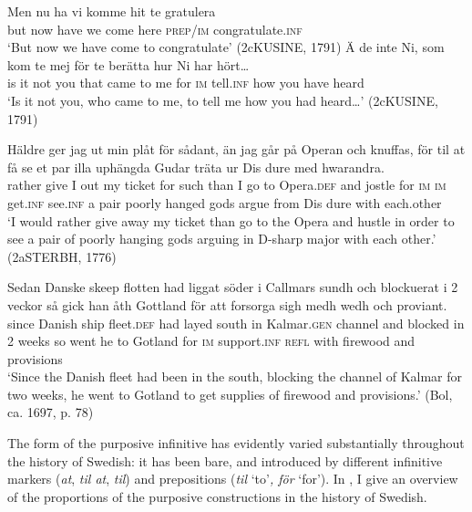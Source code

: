 \documentclass[output=paper]{langscibook}
\begin{document}
\ea
\label{ex:kalm:11}
\ea  \label{ex:kalm:11a}
\gll Men nu ha vi komme hit te gratulera\\
but now have we come here \textsc{prep}/\textsc{im} congratulate.\textsc{inf}\\
\glt ‘But now we have come to congratulate’ (2cKUSINE, 1791) 
\ex  \label{ex:kalm:11b}
\gll Ä de inte Ni, som kom te mej för te berätta hur Ni har hört…\\
is it not you that came to me for \textsc{im} tell.\textsc{inf} how you have heard\\
\glt ‘Is it not you, who came to me, to tell me how you had heard…’ (2cKUSINE, 1791)

\ex  \label{ex:kalm:11c}
\gll Häldre ger jag ut min plåt för sådant, än jag går på Operan och knuffas, för til at få se et par illa uphängda Gudar träta ur Dis dure med hwarandra.\\
rather give I out my ticket for such than I go to Opera.\textsc{def} and jostle for \textsc{im} \textsc{im} get.\textsc{inf} see.\textsc{inf} a pair poorly hanged gods argue from Dis dure with each.other\\
\glt ‘I would rather give away my ticket than go to the Opera and hustle in order to see a pair of poorly hanging gods arguing in D-sharp major with each other.’ (2aSTERBH, 1776)

\ex \label{ex:kalm:11d}
\gll Sedan Danske skeep flotten had liggat söder i Callmars sundh och blockuerat i 2 veckor så gick han åth Gottland för att forsorga sigh medh wedh och proviant.\\
since Danish ship fleet.\textsc{def} had layed south in Kalmar.\textsc{gen} channel and blocked in 2 weeks so went he to Gotland for \textsc{im} support.\textsc{inf} \textsc{refl} with firewood and provisions\\ 
\glt ‘Since the Danish fleet had been in the south, blocking the channel of Kalmar for two weeks, he went to Gotland to get supplies of firewood and provisions.’ (Bol, ca. 1697, p. 78)
\z 
\z 


\begin{sloppypar}
The form of the purposive infinitive has evidently varied substantially throughout the history of Swedish: it has been bare, and introduced by different infinitive markers (\textit{at}, \textit{til at}, \textit{til}) and prepositions (\textit{til} ‘to’\textit{, för} ‘for’). In , I give an overview of the proportions of the purposive constructions in the history of Swedish. 
\end{sloppypar}
\end{document}
